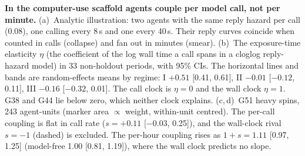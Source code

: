 \caption{\textbf{In the computer-use scaffold agents couple per model call, not per minute.}
(a)~Analytic illustration: two agents with the same reply hazard per call (0.08), one calling every 8\,s and one every 40\,s. Their reply curves coincide when counted in calls (collapse) and fan out in minutes (smear).
(b)~The exposure-time elasticity $\eta$ (the coefficient of the log wall time a call spans in a cloglog reply-hazard model) in 33 non-holdout periods, with 95\% CIs. The horizontal lines and bands are random-effects means by regime: I $+0.51$ [0.41, 0.61], II $-0.01$ [$-0.12$, 0.11], III $-0.16$ [$-0.32$, 0.01]. The call clock is $\eta=0$ and the wall clock $\eta=1$. G38 and G44 lie below zero, which neither clock explains.
(c,\,d)~G51 heavy spins, 243 agent-units (marker area $\propto$ weight, within-unit centred). The per-call coupling is flat in call rate ($s=+0.11$ [$-0.03$, 0.25]), and the wall-clock rival $s=-1$ (dashed) is excluded. The per-hour coupling rises as $1+s=1.11$ [0.97, 1.25] (model-free 1.00 [0.81, 1.19]), where the wall clock predicts no slope.}
\label{fig:H40}
